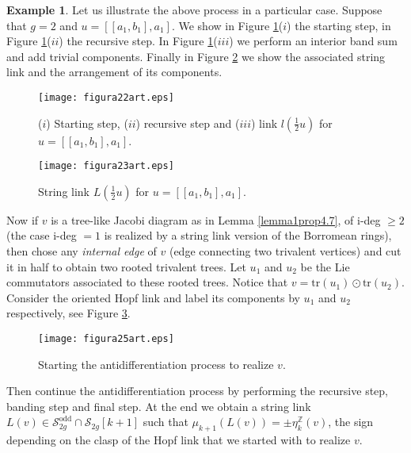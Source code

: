 \documentclass[10pt]{amsart}
\numberwithin{equation}{section}
\numberwithin{equation}{section}
\theoremstyle{definition}
\newtheorem{example}[theorem]{Example}
\begin{document}
\begin{example}
Let us illustrate the above process in a particular case. Suppose that $g=2$ and $u=[[a_1,b_1],a_1]$. We show in Figure \ref{figura22}($i$) the starting step, in  Figure \ref{figura22}($ii$) the recursive step. In  Figure \ref{figura22}($iii$) we perform an interior band sum and add trivial components. Finally in Figure \ref{figura23} we show the associated string link and the arrangement of its components.
\begin{figure}[ht!]
										\centering
                        \texttt{[image: figura22art.eps]}
												\caption{($i$) Starting step, ($ii$) recursive step and ($iii$)  link $l(\frac{1}{2}u)$ for $u=[[a_1,b_1],a_1]$.}
												\label{figura22}
\end{figure}

\begin{figure}[ht!]
										\centering
                        \texttt{[image: figura23art.eps]}
												\caption{String link $L(\frac{1}{2}u)$ for $u=[[a_1,b_1],a_1]$.}
												\label{figura23}
\end{figure}

\end{example}

Now if $v$ is a tree-like Jacobi diagram as in Lemma \ref{lemma1prop4.7}, of i-deg $\geq 2$ (the case i-deg $=1$ is realized by a string link version of the Borromean rings), then chose any \emph{internal edge} of $v$ (edge connecting two trivalent vertices) and cut it in half to obtain  two rooted trivalent trees. Let $u_1$ and $u_2$ be the Lie commutators associated to these rooted trees. Notice that $v=\text{tr}(u_1)\odot \text{tr}(u_2)$. Consider the oriented Hopf link and label its components by $u_1$ and $u_2$ respectively, see Figure \ref{figura24}.

\begin{figure}[ht!]
										\centering
                        \texttt{[image: figura25art.eps]}
												\caption{Starting the antidifferentiation process to realize $v$.}
												\label{figura24}
\end{figure}


\noindent Then continue the antidifferentiation process by performing the recursive step, banding step and final step. At the end we obtain a string link $L(v)\in\mathcal{S}^{\text{odd}}_{2g}\cap\mathcal{S}_{2g}[k+1]$ such that $\mu_{k+1}(L(v))=\pm\eta^{\mathbb{Z}}_k(v)$, the sign depending on the clasp of the  Hopf link that we started with to realize $v$. 
\end{document}

